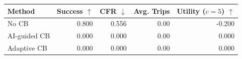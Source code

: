\begin{tabular}{lrrrr}
\toprule
Method & Success $\uparrow$ & CFR $\downarrow$ & Avg. Trips & Utility ($c=5$) $\uparrow$ \\
\midrule
No CB & 0.800 & 0.556 & 0.00 & -0.200 \\
AI-guided CB & 0.000 & 0.000 & 0.00 & 0.000 \\
Adaptive CB & 0.000 & 0.000 & 0.00 & 0.000 \\
\bottomrule
\end{tabular}
